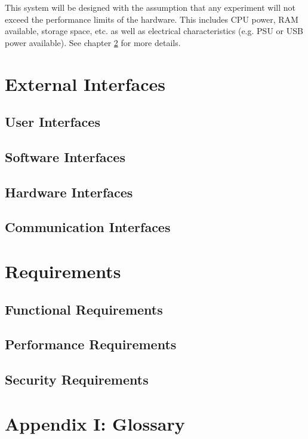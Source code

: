 \documentclass[english,titlepage,a4paper]{report}
\begin{document}
This system will be designed with the assumption that any experiment will not exceed the performance limits of the hardware.
This includes CPU power, RAM available, storage space, etc. as well as electrical characteristics (e.g. PSU or USB power available).
See chapter \ref{chapter_4} for more details.


\chapter{External Interfaces}
\section{User Interfaces}

\section{Software Interfaces}

\section{Hardware Interfaces}

\section{Communication Interfaces}


\chapter{Requirements} \label{chapter_4}
\section{Functional Requirements}

\section{Performance Requirements}

\section{Security Requirements}


\chapter*{Appendix I: Glossary}
\end{document}
